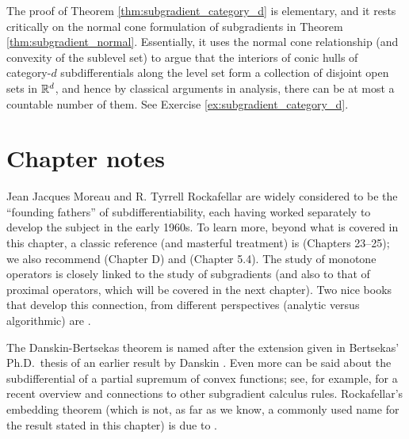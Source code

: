 
The proof of Theorem \ref{thm:subgradient_category_d} is elementary, and it
rests critically on the normal cone formulation of subgradients in Theorem 
\ref{thm:subgradient_normal}. Essentially, it uses the normal cone relationship
(and convexity of the sublevel set) to argue that the interiors of 
conic hulls of category-$d$ subdifferentials along the level set form a
collection of disjoint open sets in $\mathbb{R}^d$, and hence by classical arguments in 
analysis, there can be at most a countable number of them. See Exercise
\ref{ex:subgradient_category_d}.   

\SkipTocEntry\section*{Chapter notes}

Jean Jacques Moreau and R. Tyrrell Rockafellar are widely considered to be the
``founding fathers'' of subdifferentiability, each having worked separately to 
develop the subject in the early 1960s. To learn more, beyond what is covered in
this chapter, a classic reference (and masterful treatment) is
\cite{rockafellar1970convex} (Chapters 23--25); we also recommend
\cite{hiriartUrruty2001fundamentals} (Chapter D) and \cite{bertsekas2009convex} 
(Chapter 5.4). The study of monotone operators is closely linked to the study of 
subgradients (and also to that of proximal operators, which will be covered in
the next chapter). Two nice books that develop this connection, from different
perspectives (analytic versus algorithmic) are \cite{bauschke2011convex,
  ryu2022large}.      

The Danskin-Bertsekas theorem is named after the extension given in Bertsekas'
Ph.D.\ thesis \cite{bertsekas1971control} of an earlier result by Danskin
\cite{danskin1967theory}. Even more can be said about the subdifferential of a
partial supremum of convex functions; see, for example,
\cite{hantoute2008subdifferential} for a recent overview and connections to
other subgradient calculus rules. Rockafellar's embedding theorem (which is not, 
as far as we know, a commonly used name for the result stated in this chapter)
is due to \cite{rockafellar1966characterization}.

